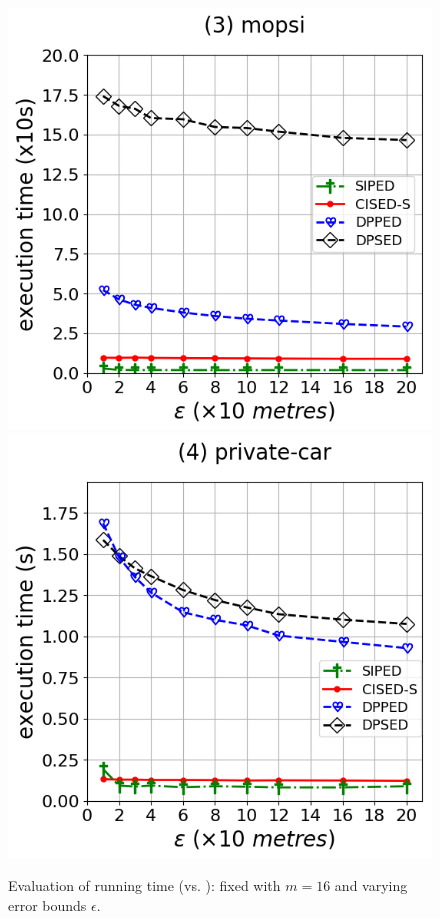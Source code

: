 {\begin{figure}[tb!]
\includegraphics[scale = 0.290]{Figures/Exp-time-epsilon-ped-mopsi.png}\hspace{1ex}
\includegraphics[scale = 0.290]{Figures/Exp-time-epsilon-ped-private.png}
\caption{\small Evaluation of running time (\ped vs. \sed): fixed with $m=16$ and varying error
  bounds $\epsilon$.}
\label{fig:time-ped}
\vspace{-1ex}
\end{figure}


}
